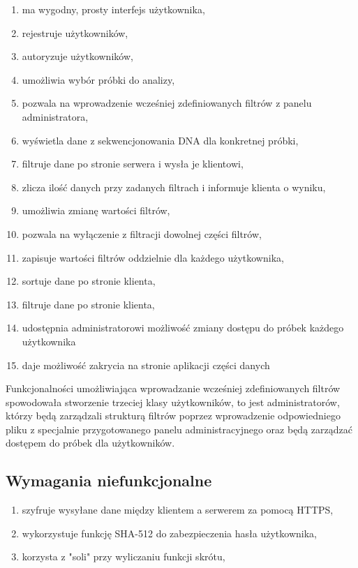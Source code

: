 \documentclass[a4paper,12pt,twoside]{article}
\begin{document}
 \begin{enumerate}[1)]
 \item ma wygodny, prosty interfejs użytkownika,
 \item rejestruje użytkowników,
 \item autoryzuje użytkowników,
 \item umożliwia wybór próbki do analizy,
 \item pozwala na wprowadzenie wcześniej zdefiniowanych filtrów z panelu administratora,
 \item wyświetla dane z sekwencjonowania DNA dla konkretnej próbki,
 \item filtruje dane po stronie serwera i wysła je klientowi,
 \item zlicza ilość danych przy zadanych filtrach i informuje klienta o wyniku,
 \item umożliwia zmianę wartości filtrów,
 \item pozwala na wyłączenie z filtracji dowolnej części filtrów,
 \item zapisuje wartości filtrów oddzielnie dla każdego użytkownika,
 \item sortuje dane po stronie klienta,
 \item filtruje dane po stronie klienta,
 \item udostępnia administratorowi możliwość zmiany dostępu do próbek 
 każdego użytkownika
 \item daje możliwość zakrycia na stronie aplikacji części danych	
 \end{enumerate}
 
Funkcjonalności umożliwiająca wprowadzanie wcześniej zdefiniowanych filtrów spowodowała stworzenie
trzeciej klasy użytkowników, to jest administratorów, którzy będą zarządzali strukturą filtrów poprzez wprowadzenie odpowiedniego pliku z specjalnie przygotowanego panelu administracyjnego
oraz będą zarządzać dostępem do próbek dla użytkowników.

\subsection{Wymagania niefunkcjonalne}
 \begin{enumerate}[1)]
  \item szyfruje wysyłane dane między klientem a serwerem za pomocą HTTPS,
  \item wykorzystuje funkcję SHA-512 do zabezpieczenia hasła użytkownika,
  \item korzysta z "soli" przy wyliczaniu funkcji skrótu,
 \end{enumerate}
\end{document}
